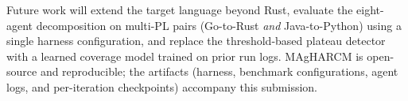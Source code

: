 Future work will extend the target language beyond Rust, evaluate the
eight-agent decomposition on multi-PL pairs (Go-to-Rust \emph{and}
Java-to-Python) using a single harness configuration, and replace the
threshold-based plateau
detector with a learned coverage model trained on prior run logs.
MAgHARCM is open-source and reproducible; the artifacts (harness,
benchmark configurations, agent logs, and per-iteration checkpoints)
accompany this submission.
